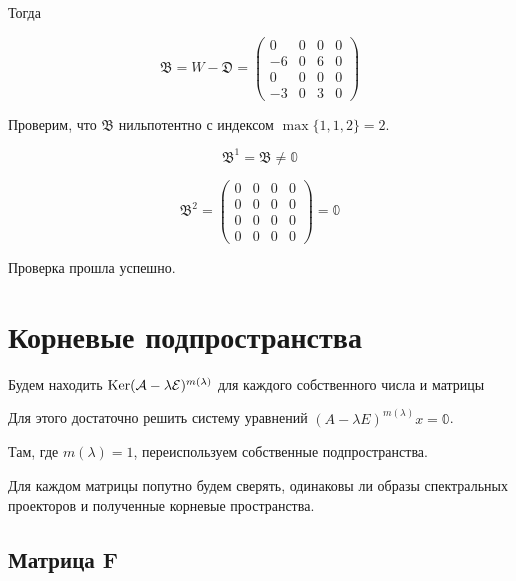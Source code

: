 \documentclass[12pt, a4paper]{article}
\begin{document}
    Тогда 

    \begin{equation}
        \mathfrak{B} = W - \mathfrak{D} = \left(\begin{matrix}
            0 & 0 & 0 & 0 \\
            -6 & 0 & 6 & 0 \\
            0 & 0 & 0 & 0 \\
            -3 & 0 & 3 & 0
        \end{matrix}\right)
    \end{equation}

    Проверим, что $\mathfrak{B}$ нильпотентно с индексом $\max\{1, 1, 2\} = 2$.

    \begin{equation}
        \mathfrak{B}^1 = \mathfrak{B} \neq \mathbb{0}
    \end{equation}

    \begin{equation}
        \mathfrak{B}^2 = \left(\begin{matrix}
            0 & 0 & 0 & 0 \\
            0 & 0 & 0 & 0 \\
            0 & 0 & 0 & 0 \\
            0 & 0 & 0 & 0
        \end{matrix}\right) = \mathbb{0}
    \end{equation}

    Проверка прошла успешно.

    



    \section{Корневые подпространства}

    Будем находить $\operatorname{Ker} (\mathcal{A} - \lambda \mathcal{E})^{m(\lambda)}$ для каждого собственного числа и матрицы
    
    Для этого достаточно решить систему уравнений $(A - \lambda E)^{m(\lambda)} x = \mathbb{0}$.

    Там, где $m(\lambda) = 1$, переиспользуем собственные подпространства.


    Для каждом матрицы попутно будем сверять, одинаковы ли образы спектральных проекторов и полученные корневые пространства.

    \subsection{Матрица F}
\end{document}

